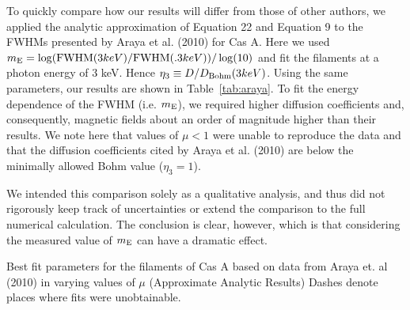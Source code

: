 \documentclass[iop, apj, numberedappendix, twocolappendix]{emulateapj}
\begin{document}
To quickly compare how our results will differ from those of other authors, we
applied the analytic approximation of Equation 22 and Equation 9 to the FWHMs
presented by Araya et al. (2010) for Cas A. Here we used $m_{\rm E} = \log(
{\rm FWHM}(3keV)/{\rm FWHM}(.3keV))/\log(10)$ and fit the filaments at a photon
energy of 3 keV.  Hence $\eta_3 \equiv D/D_{\rm Bohm}(3 keV)$. Using the same
parameters, our results are shown in Table~\ref{tab:araya}. To fit the energy
dependence of the FWHM (i.e. $m_{\rm E}$), we required higher diffusion
coefficients and, consequently, magnetic fields about an order of magnitude
higher than their results. We note here that values of $\mu<1$ were unable to
reproduce the data and that the diffusion coefficients cited by Araya et al.
(2010) are below the minimally allowed Bohm value ($\eta_3 = 1$).

We intended this comparison solely as a qualitative analysis, and thus did not
rigorously keep track of uncertainties or extend the comparison to the full
numerical calculation. The conclusion is clear, however, which is that
considering the measured value of $m_{\rm E}$ can have a dramatic effect.

\begin{table}[h]
\tiny
\centering
\caption{Best fit parameters for the filaments of Cas A based on data from
Araya et. al (2010) in varying values of $\mu$ (Approximate Analytic Results)
Dashes denote places where fits were unobtainable.
\label{tab:araya}}

\end{table}



\end{document}
